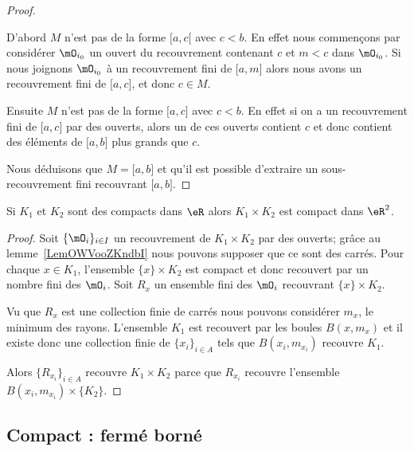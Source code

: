 \begin{proof}
\begin{subproof}
        D'abord \( M\) n'est pas de la forme \( \mathopen[ a , c [\) avec \( c<b\). En effet nous commençons par considérer \( \mO_{i_0}\) un ouvert du recouvrement contenant \( c\) et \( m<c\) dans \( \mO_{i_0}\). Si nous joignons \( \mO_{i_0}\) à un recouvrement fini de \( \mathopen[ a , m \mathclose]\) alors nous avons un recouvrement fini de \( \mathopen[ a , c \mathclose]\), et donc \( c\in M\).

        Ensuite \( M\) n'est pas de la forme \( \mathopen[ a , c \mathclose]\) avec \( c<b\). En effet si on a un recouvrement fini de \( \mathopen[ a , c \mathclose]\) par des ouverts, alors un de ces ouverts contient \( c\) et donc contient des éléments de \( \mathopen[ a , b \mathclose]\) plus grands que \( c\).
    \end{subproof}
    Nous déduisons que \( M=\mathopen[ a , b \mathclose]\) et qu'il est possible d'extraire un sous-recouvrement fini recouvrant \( \mathopen[ a , b \mathclose]\).
\end{proof}

\begin{lemma}\label{LemCKBooXkwkte}
    Si \( K_1\) et \( K_2\) sont des compacts dans \( \eR\) alors \( K_1\times K_2\) est compact dans \( \eR^2\).
\end{lemma}

\begin{proof}
    Soit \( \{ \mO_i \}_{i\in I}\) un recouvrement de \( K_1\times K_2\) par des ouverts; grâce au lemme~\ref{LemOWVooZKndbI} nous pouvons supposer que ce sont des carrés. Pour chaque \( x\in K_1\), l'ensemble \( \{ x \}\times K_2\) est compact et donc recouvert par un nombre fini des \( \mO_i\). Soit \( R_x\) un ensemble fini des \( \mO_i\) recouvrant \( \{ x \}\times K_2\).

    Vu que \( R_x\) est une collection finie de carrés nous pouvons considérer \( m_x\), le minimum des rayons. L'ensemble \( K_1\) est recouvert par les boules \( B(x,m_x)\) et il existe donc une collection finie de \( \{ x_i \}_{i\in A}\) tels que \( B(x_i,m_{x_i})\) recouvre \( K_1\).

    Alors \( \{ R_{x_i} \}_{i\in A}\) recouvre \( K_1\times K_2\) parce que \( R_{x_i}\) recouvre l'ensemble \( B(x_i,m_{x_i})\times \{ K_2 \}\).
\end{proof}

\subsection{Compact : fermé borné}

